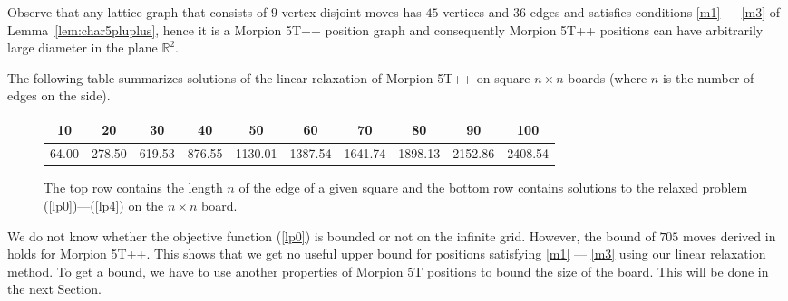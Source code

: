 Observe that any lattice graph that consists of $9$ vertex-disjoint moves has $45$ vertices and $36$ edges and satisfies conditions \ref{m1} --- \ref{m3} of Lemma~\ref{lem:char5pluplus}, hence it is a Morpion 5T++ position graph and consequently Morpion 5T++ positions can have arbitrarily large diameter in the plane ${\mathbb R}^2$.

The following table summarizes solutions of the linear relaxation of Morpion 5T++ on square $n \times n$ boards (where $n$ is the number of edges on the side).%
\begin{figure}[H]

\bgroup
\def\arraystretch{1.5}
\setlength\tabcolsep{1mm}
\begin{tabular}{|c|c|c|c|c|c|c|c|c|c|}
\hline
10 & 20 & 30 & 40 & 50 & 60 & 70 & 80 & 90 & 100 \\
\hline
64.00 & 278.50 & 619.53 & 876.55 & 1130.01 & 1387.54 & 1641.74 & 1898.13 & 2152.86 & 2408.54 \\
\hline
\end{tabular}
\egroup
\caption{The top row contains the length $n$ of the edge of a given square and the bottom row contains solutions to the relaxed problem (\ref{lp0})---(\ref{lp4}) on the $n\times n$ board. }
\end{figure}

We do not know whether the objective function (\ref{lp0}) is bounded or not on the infinite grid. However, the bound of $705$ moves derived in \cite{demaine} %
holds for Morpion 5T++. 
This shows that we get no useful upper bound for positions satisfying \ref{m1} --- \ref{m3} using our linear relaxation method. To get a bound, we have to use another properties of Morpion 5T positions to bound the size of the board. This will be done in the next Section.%


